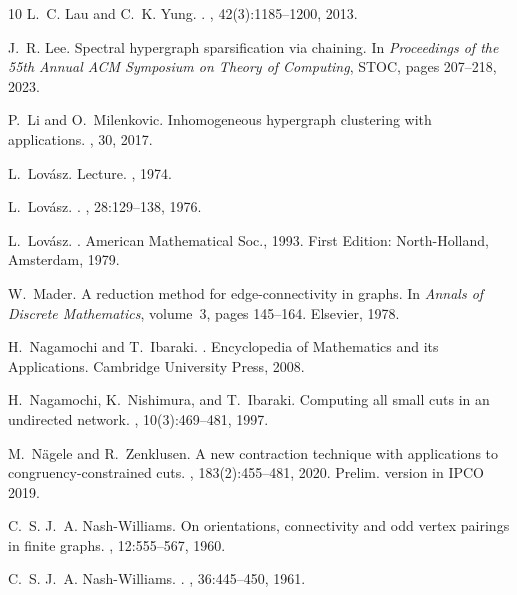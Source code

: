 \documentclass{article}
\begin{document}
\begin{thebibliography}{10}
L.~C. Lau and C.~K. Yung.
.
, 42(3):1185--1200, 2013.

J.~R. Lee.
\newblock Spectral hypergraph sparsification via chaining.
\newblock In {\em Proceedings of the 55th Annual ACM Symposium on Theory of Computing}, STOC, pages 207--218, 2023.

P.~Li and O.~Milenkovic.
\newblock Inhomogeneous hypergraph clustering with applications.
, 30, 2017.

L.~Lov{\'a}sz.
\newblock Lecture.
, 1974.

L.~Lov\'{a}sz.
.
, 28:129--138, 1976.

L.~Lov{\'a}sz.
.
\newblock American Mathematical Soc., 1993.
\newblock First Edition: North-Holland, Amsterdam, 1979.

W.~Mader.
\newblock A reduction method for edge-connectivity in graphs.
\newblock In {\em Annals of Discrete Mathematics}, volume~3, pages 145--164. Elsevier, 1978.

H.~Nagamochi and T.~Ibaraki.
.
\newblock Encyclopedia of Mathematics and its Applications. Cambridge University Press, 2008.

H.~Nagamochi, K.~Nishimura, and T.~Ibaraki.
\newblock Computing all small cuts in an undirected network.
, 10(3):469--481, 1997.

M.~N\"{a}gele and R.~Zenklusen.
\newblock A new contraction technique with applications to congruency-constrained cuts.
, 183(2):455--481, 2020.
\newblock Prelim. version in IPCO 2019.

C.~S. J.~A. Nash-Williams.
\newblock On orientations, connectivity and odd vertex pairings in finite graphs.
, 12:555--567, 1960.

C.~S. J.~A. Nash-Williams.
.
, 36:445--450, 1961.


\end{thebibliography}
\end{document}
